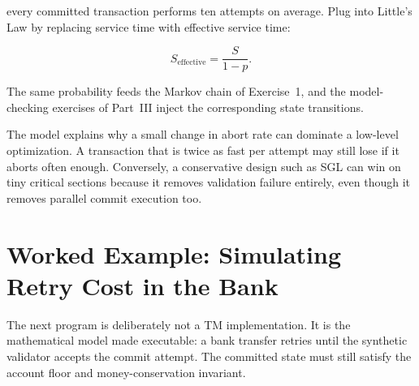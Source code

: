 every committed transaction performs ten attempts on average. Plug into Little's Law by replacing service time with effective service time:

$$
S_{\mathrm{effective}} = \frac{S}{1-p}.
$$

The same probability feeds the Markov chain of Exercise~1, and the model-checking exercises of Part~III inject the corresponding state transitions.

The model explains why a small change in abort rate can dominate a low-level optimization. A transaction that is twice as fast per attempt may still lose if it aborts often enough. Conversely, a conservative design such as SGL can win on tiny critical sections because it removes validation failure entirely, even though it removes parallel commit execution too.

\section{Worked Example: Simulating Retry Cost in the Bank}
\label{sec:math-bank-simulation}

The next program is deliberately not a TM implementation. It is the mathematical model made executable: a bank transfer retries until the synthetic validator accepts the commit attempt. The committed state must still satisfy the account floor and money-conservation invariant.

